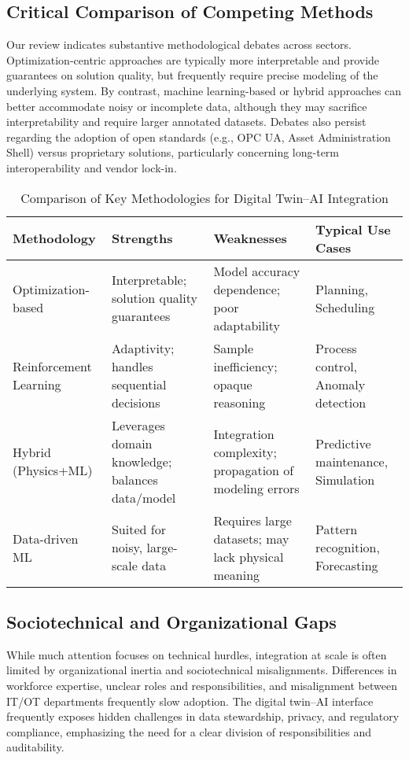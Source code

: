 \documentclass[sigconf]{acmart}
\begin{document}
\subsection{Critical Comparison of Competing Methods}

Our review indicates substantive methodological debates across sectors. Optimization-centric approaches are typically more interpretable and provide guarantees on solution quality, but frequently require precise modeling of the underlying system. By contrast, machine learning-based or hybrid approaches can better accommodate noisy or incomplete data, although they may sacrifice interpretability and require larger annotated datasets. Debates also persist regarding the adoption of open standards (e.g., OPC UA, Asset Administration Shell) versus proprietary solutions, particularly concerning long-term interoperability and vendor lock-in.

\begin{table*}[htbp]
\centering
\caption{Comparison of Key Methodologies for Digital Twin–AI Integration}
\label{tab:method_comparison}
\begin{adjustbox}{max width=\textwidth}
\begin{tabular}{@{}llll@{}}
\toprule
Methodology & Strengths & Weaknesses & Typical Use Cases\\
\midrule
Optimization-based & Interpretable; solution quality guarantees & Model accuracy dependence; poor adaptability & Planning, Scheduling\\
Reinforcement Learning & Adaptivity; handles sequential decisions & Sample inefficiency; opaque reasoning & Process control, Anomaly detection\\
Hybrid (Physics+ML) & Leverages domain knowledge; balances data/model & Integration complexity; propagation of modeling errors & Predictive maintenance, Simulation\\
Data-driven ML & Suited for noisy, large-scale data & Requires large datasets; may lack physical meaning & Pattern recognition, Forecasting\\
\bottomrule
\end{tabular}
\end{adjustbox}
\end{table*}

\subsection{Sociotechnical and Organizational Gaps}

While much attention focuses on technical hurdles, integration at scale is often limited by organizational inertia and sociotechnical misalignments. Differences in workforce expertise, unclear roles and responsibilities, and misalignment between IT/OT departments frequently slow adoption. The digital twin–AI interface frequently exposes hidden challenges in data stewardship, privacy, and regulatory compliance, emphasizing the need for a clear division of responsibilities and auditability.
\end{document}
